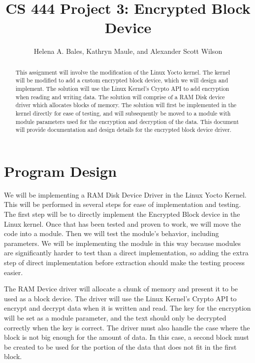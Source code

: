 \documentclass[letterpaper,10pt]{article}
\title{CS 444 Project 3: Encrypted Block Device}
\author{Helena A. Bales, Kathryn Maule, and Alexander Scott Wilson }
\begin{document}
\maketitle

\begin{abstract}
This assignment will involve the modification of the Linux Yocto kernel. 
The kernel will be modified to add a custom encrypted block device, which we will design and implement. 
The solution will use the Linux Kernel's Crypto API to add encryption when reading and writing data. 
The solution will comprise of a RAM Disk device driver which allocates blocks of memory. 
The solution will first be implemented in the kernel directly for ease of testing, and will subsequently
 be moved to a module with module parameters used for the encryption and decryption of the data. 
This document will provide documentation and design details for the encrypted block device driver.
\end{abstract}

\clearpage

\tableofcontents

\clearpage

\section{Program Design}
We will be implementing a RAM Disk Device Driver in the Linux Yocto Kernel. 
This will be performed in several steps for ease of implementation and testing. 
The first step will be to directly implement the Encrypted Block device in the Linux kernel. 
Once that has been tested and proven to work, we will move the code into a module. 
Then we will test the module's behavior, including parameters. 
We will be implementing the module in this way because modules are significantly harder to test than a 
direct implementation, so adding the extra step of direct implementation before extraction should make 
the testing process easier.

The RAM Device driver will allocate a chunk of memory and present it to be used as a block device. 
The driver will use the Linux Kernel's Crypto API to encrypt and decrypt data when it is written and 
read. The key for the encryption will be set as a module parameter, and the text should only be 
decrypted correctly when the key is correct. The driver must also handle the case where the block is not
 big enough for the amount of data. In this case, a second block must be created to be used for the 
portion of the data that does not fit in the first block.
\end{document}

